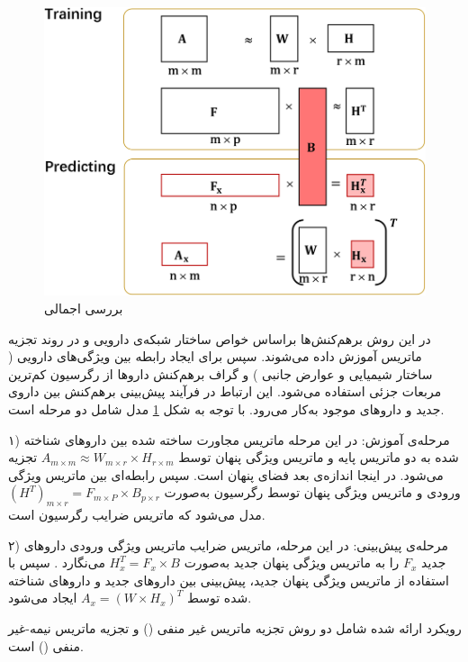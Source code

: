 \begin{figure}[!h]
\centering
\includegraphics[scale=.4]{section2/DDINMF.png}
	\caption{بررسی اجمالی 
\cite{Yu H2018}}
\label{DDINMF}
\end{figure}
در این روش برهم‌کنش‌ها براساس خواص ساختار شبکه‌ی دارویی  و در روند تجزیه ماتریس آموزش داده می‌شوند. سپس برای ایجاد رابطه بین ویژگی‌های دارویی ( ساختار شیمیایی و عوارض جانبی ) و گراف برهم‌کنش داروها از رگرسیون کم‌ترین مربعات جزئی استفاده می‌شود. این ارتباط در فرآیند پیش‌بینی برهم‌کنش بین داروی جدید و داروهای موجود به‌کار می‌رود. با توجه به شکل
\ref{DDINMF}
مدل 
شامل دو مرحله است.

۱) مرحله‌ی آموزش: در این مرحله ماتریس مجاورت ساخته ‌شده بین داروهای شناخته شده به دو ماتریس پایه
و ماتریس ویژگی پنهان
توسط 
$A_{m\times m}\approx{W_{m\times r}\times{H_{r\times m}}}$
تجزیه می‌شود. در اینجا 
اندازه‌ی بعد فضای پنهان است. سپس رابطه‌ای بین ماتریس ویژگی‌ ورودی
و ماتریس ویژگی پنهان
توسط رگرسیون به‌صورت 
$(H^T)_{m\times r}={F_{m\times P}\times{B_{p\times r}}}$
مدل می‌شود که 
ماتریس ضرایب رگرسیون است.

۲) مرحله‌ی پیش‌بینی: در این مرحله، ماتریس ضرایب
ماتریس ویژگی ورودی داروهای جدید
$F_x$ 
را به ماتریس ویژگی پنهان جدید به‌صورت
${H^T_x}={F_x\times B}$
می‌نگارد
.
سپس با استفاده از ماتریس ویژگی پنهان جدید، پیش‌بینی بین داروهای جدید و داروهای شناخته شده توسط
${A_x}={(W\times{H_x})}^T$
ایجاد می‌شود.

 رویکرد ارائه ‌شده شامل دو روش تجزیه ماتریس غیر منفی
()
 و تجزیه ماتریس نیمه-غیر منفی
()
 است. 
 
